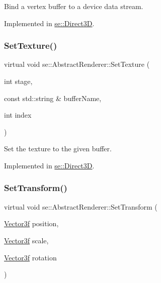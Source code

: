 Bind a vertex buffer to a device data stream. 

Implemented in \mbox{\hyperlink{classse_1_1_direct3_d_a0be0c6f8f0c90478def2ade3459226ba}{se\+::\+Direct3D}}.

\mbox{\label{classse_1_1_abstract_renderer_aa7fc2284df16ba0b42059560599ff013}} 
\subsubsection{\texorpdfstring{Set\+Texture()}{SetTexture()}}
{\footnotesize\ttfamily virtual void se\+::\+Abstract\+Renderer\+::\+Set\+Texture (\begin{DoxyParamCaption}\item[{int}]{stage,  }\item[{const std\+::string \&}]{buffer\+Name,  }\item[{int}]{index }\end{DoxyParamCaption})\hspace{0.3cm}{\ttfamily [pure virtual]}}

Set the texture to the given buffer. 

Implemented in \mbox{\hyperlink{classse_1_1_direct3_d_a5e78e332321a2a66ba184b4441e3ec31}{se\+::\+Direct3D}}.

\mbox{\label{classse_1_1_abstract_renderer_afe47dd77096e92a25260cacb50631d8f}} 
\subsubsection{\texorpdfstring{Set\+Transform()}{SetTransform()}}
{\footnotesize\ttfamily virtual void se\+::\+Abstract\+Renderer\+::\+Set\+Transform (\begin{DoxyParamCaption}\item[{\mbox{\hyperlink{namespacese_a12e07512d95e2fdebdaf74a5ea2cf5f6}{Vector3f}}}]{position,  }\item[{\mbox{\hyperlink{namespacese_a12e07512d95e2fdebdaf74a5ea2cf5f6}{Vector3f}}}]{scale,  }\item[{\mbox{\hyperlink{namespacese_a12e07512d95e2fdebdaf74a5ea2cf5f6}{Vector3f}}}]{rotation }\end{DoxyParamCaption})\hspace{0.3cm}{\ttfamily [pure virtual]}}

